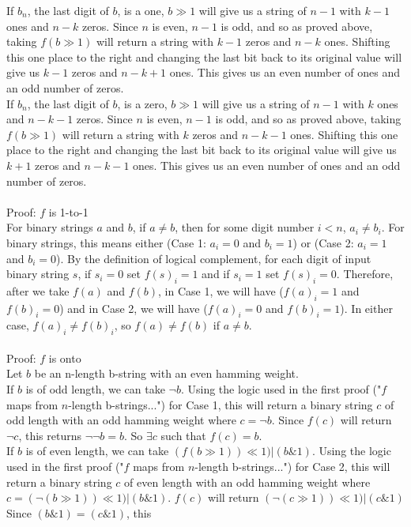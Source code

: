 \documentclass[12pt]{article}
\begin{document}
\begin{enumerate}
If $b_n$, the last digit of $b$, is a one, $b\gg 1$ will give us a string of $n-1$ with $k-1$ ones and $n-k$ zeros. Since $n$ is even, $n-1$ is odd, and so as proved above, taking $f(b \gg 1)$ will return a string with $k-1$ zeros and $n-k$ ones. Shifting this one place to the right and changing the last bit back to its original value will give us $k-1$ zeros and $n-k+1$ ones. This gives us an even number of ones and an odd number of zeros. \\
If $b_n$, the last digit of $b$, is a zero, $b\gg 1$ will give us a string of $n-1$ with $k$ ones and $n-k-1$ zeros. Since $n$ is even, $n-1$ is odd, and so as proved above, taking $f(b \gg 1)$ will return a string with $k$ zeros and $n-k-1$ ones. Shifting this one place to the right and changing the last bit back to its original value will give us $k+1$ zeros and $n-k-1$ ones. This gives us an even number of ones and an odd number of zeros. \\
\\
Proof: $f$ is 1-to-1\\
For binary strings $a$ and $b$, if $a \neq b$, then for some digit number $i < n$, $a_i \neq b_i$. For binary strings, this means either (Case 1: $a_i = 0$ and $b_i = 1$) or (Case 2: $a_i = 1$ and $b_i = 0$). By the definition of logical complement, for each digit of input binary string $s$, if $s_i = 0$ set $f(s)_i = 1$ and if $s_i = 1$ set $f(s)_i = 0$. Therefore, after we take $f(a)$ and $f(b)$, in Case 1, we will have ($f(a)_i = 1$ and $f(b)_i = 0$) and in Case 2, we will have ($f(a)_i = 0$ and $f(b)_i = 1$). In either case, $f(a)_i \neq f(b)_i$, so $f(a) \neq f(b)$ if $a \neq b$. \\
\\
Proof: $f$ is onto \\
Let $b$ be an n-length b-string with an even hamming weight. \\
If $b$ is of odd length, we can take $\neg b$. Using the logic used in the first proof ("$f$ maps from $n$-length b-strings...") for Case 1, this will return a binary string $c$ of odd length with an odd hamming weight where $c = \neg b$. Since $f(c)$ will return $\neg c$, this returns $\neg\neg b = b$. So $\exists c$ such that $f(c) = b$. \\
If $b$ is of even length, we can take $(f(b \gg 1))\ll1)|(b \& 1)$. Using the logic used in the first proof ("$f$ maps from $n$-length b-strings...") for Case 2, this will return a binary string $c$ of even length with an odd hamming weight where $c = (\neg(b \gg 1))\ll1)|(b \& 1)$. $f(c)$ will return $(\neg(c \gg 1))\ll1)|(c \& 1)$ Since $(b \& 1) = (c \& 1)$, this \\

\end{enumerate}
\end{document}

